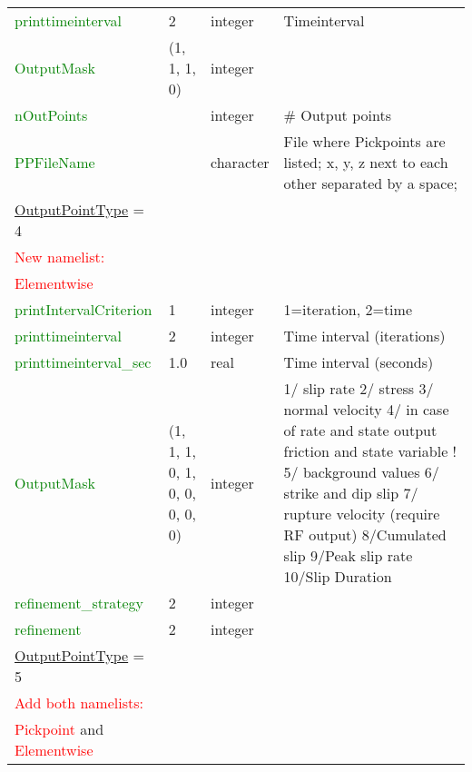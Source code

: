 \documentclass[12pt,twoside]{article}
\begin{document}
\begin{longtable}{|p{4.8cm}|p{2.4cm}|p{2cm}|p{5cm}|}
\textcolor{green}{printtimeinterval} & 2 & integer & Timeinterval\\
\textcolor{green}{OutputMask} & (1, 1, 1, 0) & integer & \\
\textcolor{green}{nOutPoints} & & integer & \# Output points\\
\textcolor{green}{PPFileName} & & character& File where Pickpoints are listed; x, y, z next to each other separated by a space;\\
\hdashline
\uline{OutputPointType} = 4 & & &\\
\textcolor{red}{New namelist:} & & &\\
\textcolor{red}{Elementwise} & & &\\
\textcolor{green}{printIntervalCriterion} & 1 & integer & 1=iteration, 2=time\\
\textcolor{green}{printtimeinterval} & 2 & integer & Time interval (iterations)\\
\textcolor{green}{printtimeinterval\_sec} & 1.0 & real & Time interval (seconds)\\
\textcolor{green}{OutputMask} & (1, 1, 1, 0, 1, 0, 0, 0, 0, 0)& integer & 1/ slip rate 2/ stress 3/ normal velocity 4/ in case of rate and state output friction and state variable
                               ! 5/ background values 6/ strike and dip slip 7/ rupture velocity (require RF output) 8/Cumulated slip 9/Peak slip rate 10/Slip Duration\\
\textcolor{green}{refinement\_strategy} & 2 & integer & \\
\textcolor{green}{refinement} & 2 & integer & \\
\hdashline
\uline{OutputPointType} = 5 & & &\\
\textcolor{red}{Add both namelists:} & & &\\
\textcolor{red}{Pickpoint} and \textcolor{red}{Elementwise} & & &\\
\hline
\end{longtable}
\end{document}
